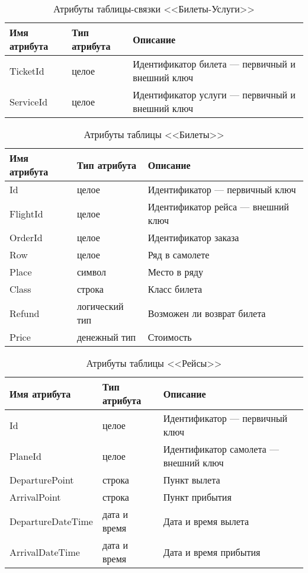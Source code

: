 \documentclass{bmstu}
\begin{document}
\begin{table}[H]
\caption{Атрибуты таблицы-связки <<Билеты-Услуги>>}
\label{tabular:tickets_services}
\begin{tabular}{|>{\raggedleft}p{4cm}|>{\raggedleft}p{3cm}|>{\raggedleft}p{8cm}|}
\hline
\textbf{Имя атрибута} & \textbf{Тип атрибута} & \textbf{Описание}
\tabularnewline
\hline
TicketId & целое & Идентификатор билета --- первичный и внешний ключ
\tabularnewline
\hline
ServiceId & целое & Идентификатор услуги --- первичный и внешний ключ
\tabularnewline
\hline
\end{tabular}
\end{table}

\begin{table}[H]
\caption{Атрибуты таблицы <<Билеты>>}
\label{tabular:tickets}
\begin{tabular}{|>{\raggedleft}p{4cm}|>{\raggedleft}p{3cm}|>{\raggedleft}p{8cm}|}
\hline
\textbf{Имя атрибута} & \textbf{Тип атрибута} & \textbf{Описание}
\tabularnewline
\hline
Id & целое & Идентификатор --- первичный ключ
\tabularnewline
\hline
FlightId & целое & Идентификатор рейса --- внешний ключ
\tabularnewline
\hline
OrderId & целое & Идентификатор заказа
\tabularnewline
\hline
Row & целое & Ряд в самолете
\tabularnewline
\hline
Place & символ & Место в ряду
\tabularnewline
\hline
Class & строка & Класс билета
\tabularnewline
\hline
Refund & логический тип & Возможен ли возврат билета
\tabularnewline
\hline
Price & денежный тип & Стоимость
\tabularnewline
\hline
\end{tabular}
\end{table}

\begin{table}[H]
\caption{Атрибуты таблицы <<Рейсы>>}
\label{tabular:flights}
\begin{tabular}{|>{\raggedleft}p{4cm}|>{\raggedleft}p{3cm}|>{\raggedleft}p{8cm}|}
\hline
\textbf{Имя атрибута} & \textbf{Тип атрибута} & \textbf{Описание}
\tabularnewline
\hline
Id & целое & Идентификатор --- первичный ключ
\tabularnewline
\hline
PlaneId & целое & Идентификатор самолета --- внешний ключ
\tabularnewline
\hline
DeparturePoint & строка & Пункт вылета
\tabularnewline
\hline
ArrivalPoint & строка & Пункт прибытия
\tabularnewline
\hline
DepartureDateTime & дата и время & Дата и время вылета
\tabularnewline
\hline
ArrivalDateTime & дата и время & Дата и время прибытия
\tabularnewline
\hline
\end{tabular}
\end{table}
\end{document}
